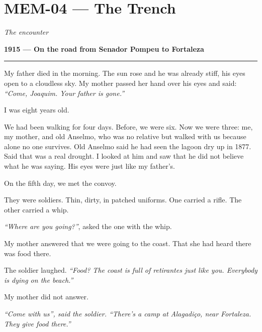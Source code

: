 \section*{\textbf{MEM-04} --- The Trench}

\noindent \textit{The encounter}

\noindent \textbf{1915 --- On the road from Senador Pompeu to Fortaleza}

\vspace{0.5em}\noindent\rule{\textwidth}{0.5pt}\vspace{0.5em}

\noindent My father died in the morning. The sun rose and he was already stiff, his eyes open to a cloudless sky. My mother passed her hand over his eyes and said: \textit{\textquotedblleft{}Come, Joaquim. Your father is gone.\textquotedblright{}}

\noindent I was eight years old.

\noindent We had been walking for four days. Before, we were six. Now we were three: me, my mother, and old Anselmo, who was no relative but walked with us because alone no one survives. Old Anselmo said he had seen the lagoon dry up in 1877. Said that was a real drought. I looked at him and saw that he did not believe what he was saying. His eyes were just like my father's.

\noindent On the fifth day, we met the convoy.

\noindent They were soldiers. Thin, dirty, in patched uniforms. One carried a rifle. The other carried a whip.

\noindent \textit{\textquotedblleft{}Where are you going?\textquotedblright{}}, asked the one with the whip.

\noindent My mother answered that we were going to the coast. That she had heard there was food there.

\noindent The soldier laughed. \textit{\textquotedblleft{}Food? The coast is full of retirantes just like you. Everybody is dying on the beach.\textquotedblright{}}

\noindent My mother did not answer.

\noindent \textit{\textquotedblleft{}Come with us\textquotedblright{}\textit{, said the soldier. }\textquotedblleft{}There's a camp at Alagadiço, near Fortaleza. They give food there.\textquotedblright{}}

